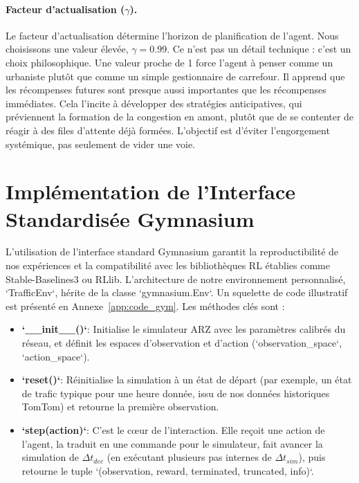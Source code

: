 \paragraph{Facteur d'actualisation ($\gamma$).} Le facteur d'actualisation détermine l'horizon de planification de l'agent. Nous choisissons une valeur élevée, $\gamma = 0.99$. Ce n'est pas un détail technique : c'est un choix philosophique. Une valeur proche de 1 force l'agent à penser comme un urbaniste plutôt que comme un simple gestionnaire de carrefour. Il apprend que les récompenses futures sont presque aussi importantes que les récompenses immédiates. Cela l'incite à développer des stratégies anticipatives, qui préviennent la formation de la congestion en amont, plutôt que de se contenter de réagir à des files d'attente déjà formées. L'objectif est d'éviter l'engorgement systémique, pas seulement de vider une voie.

\section{Implémentation de l'Interface Standardisée Gymnasium}
\label{sec:implementation_gym}

L'utilisation de l'interface standard Gymnasium \parencite{Gymnasium:2023} garantit la reproductibilité de nos expériences et la compatibilité avec les bibliothèques RL établies comme Stable-Baselines3 ou RLlib. L'architecture de notre environnement personnalisé, `TrafficEnv`, hérite de la classe `gymnasium.Env`. Un squelette de code illustratif est présenté en Annexe~\ref{app:code_gym}. Les méthodes clés sont :

\begin{itemize}
    \item \textbf{`\_\_init\_\_()`}: Initialise le simulateur ARZ avec les paramètres calibrés du réseau, et définit les espaces d'observation et d'action (`observation\_space`, `action\_space`).
    \item \textbf{`reset()`}: Réinitialise la simulation à un état de départ (par exemple, un état de trafic typique pour une heure donnée, issu de nos données historiques TomTom) et retourne la première observation.
    \item \textbf{`step(action)`}: C'est le cœur de l'interaction. Elle reçoit une action de l'agent, la traduit en une commande pour le simulateur, fait avancer la simulation de $\Delta t_{dec}$ (en exécutant plusieurs pas internes de $\Delta t_{sim}$), puis retourne le tuple `(observation, reward, terminated, truncated, info)`.
\end{itemize}


